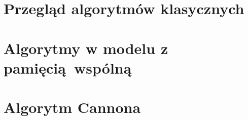 \section{Przegląd algorytmów klasycznych}


\section{Algorytmy w modelu z pamięcią wspólną}


\section{Algorytm Cannona}\label{sec:algorytm_cannona}



